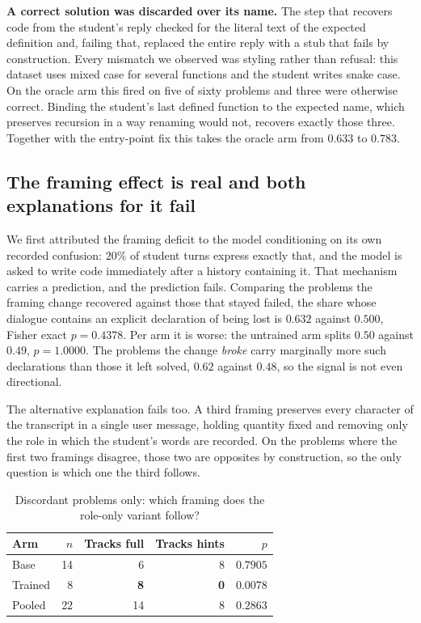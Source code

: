 \textbf{A correct solution was discarded over its name.} The step that recovers
code from the student's reply checked for the literal text of the expected
definition and, failing that, replaced the entire reply with a stub that fails by
construction. Every mismatch we observed was styling rather than refusal: this
dataset uses mixed case for several functions and the student writes snake case.
On the oracle arm this fired on five of sixty problems and three were otherwise
correct. Binding the student's last defined function to the expected name, which
preserves recursion in a way renaming would not, recovers exactly those three.
Together with the entry-point fix this takes the oracle arm from $0.633$ to
$0.783$.


%
\subsection{The framing effect is real and both explanations for it fail}
\label{sec:framing-mech}

We first attributed the framing deficit to the model conditioning on its own
recorded confusion: $20\%$ of student turns express exactly that, and the model
is asked to write code immediately after a history containing it. That mechanism
carries a prediction, and the prediction fails. Comparing the problems the
framing change recovered against those that stayed failed, the share whose
dialogue contains an explicit declaration of being lost is $0.632$ against
$0.500$, Fisher exact $p{=}0.4378$. Per arm it is worse: the untrained arm
splits $0.50$ against $0.49$, $p{=}1.0000$. The problems the change
\emph{broke} carry marginally more such declarations than those it left solved,
$0.62$ against $0.48$, so the signal is not even directional.

The alternative explanation fails too. A third framing preserves every character
of the transcript in a single user message, holding quantity fixed and removing
only the role in which the student's words are recorded. On the problems where
the first two framings disagree, those two are opposites by construction, so the
only question is which one the third follows.

\begin{table}[t]
\caption{Discordant problems only: which framing does the role-only variant
follow?}
\label{tab:quoted}
\centering
\small
\begin{tabular}{lrrrr}
\toprule
\textbf{Arm} & \textbf{$n$} & \textbf{Tracks full} & \textbf{Tracks hints} &
\textbf{$p$} \\
\midrule
Base    & 14 & 6 & 8 & $0.7905$ \\
Trained &  8 & \textbf{8} & \textbf{0} & $\mathbf{0.0078}$ \\
Pooled  & 22 & 14 & 8 & $0.2863$ \\
\bottomrule
\end{tabular}
\end{table}

